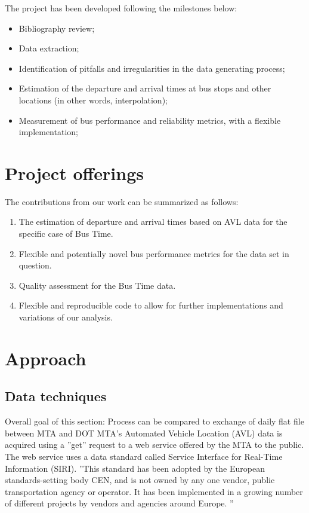 \documentclass[12pt]{report}
\begin{document}
The project has been developed following the milestones below:

\begin{itemize}
\item Bibliography review; 
\item Data extraction; 
\item Identification of pitfalls and irregularities in the data generating process;
\item Estimation of the departure and arrival times at bus stops and other locations (in other words, interpolation); 
\item Measurement of bus performance and reliability metrics, with a flexible implementation;
\end{itemize}

\section{Project offerings}

The contributions from our work can be summarized as follows:

\begin{enumerate}
\item The estimation of departure and arrival times based on AVL data for the specific case of Bus Time. 
\item Flexible and potentially novel bus performance metrics for the data set in question.
\item Quality assessment for the Bus Time data.
\item Flexible and reproducible code to allow for further implementations and variations of our analysis.

\end{enumerate}


\section{Approach}

\subsection{Data techniques}

Overall goal of this section: Process can be compared to exchange of daily flat file between MTA and  DOT MTA's Automated Vehicle Location (AVL) data is acquired using a ''get'' request to a web service offered by the MTA to the public.  The web service uses a data standard called Service Interface for Real-Time Information (SIRI).  ''This standard has been adopted by the European standards-setting body CEN, and is not owned by any one vendor, public transportation agency or operator.  It has been implemented in a growing number of different projects by vendors and agencies around Europe. ''
\end{document}
